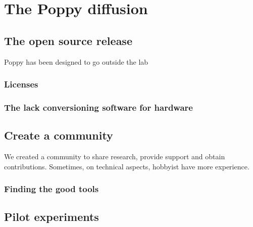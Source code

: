 
\newpage
\thispagestyle{plain}
\mbox{}



\chapter{The Poppy diffusion} %


\section{The open source release} %

Poppy has been designed to go outside the lab

\subsection{Licenses} %

\subsection{The lack conversioning software for hardware} %

\section{Create a community} %

We created a community to share research, provide support and obtain contributions.
Sometimes, on technical aspects, hobbyist have more experience.

\subsection{Finding the good tools} %


\section{Pilot experiments} %

